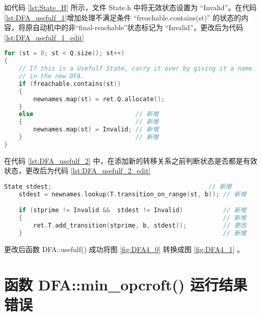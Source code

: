 如代码 \ref{lst:State_H} 所示，文件 State.h 中将无效状态设置为 “Invalid”。在代码 \ref{lst:DFA_usefulf_1}增加处理不满足条件 “freachable.contains(st)” 的状态的内容，将原自动机中的非“final-reachable”状态标记为 “Invalid”，更改后为代码 \ref{lst:DFA_usefulf_1_edit}
\lstset{style=mystyle}
\begin{lstlisting}[language=C++,label={lst:DFA_usefulf_1_edit},caption={ 更改后的 DFA.cpp },firstnumber=91]
for (st = 0; st < Q.size(); st++)
{
    // If this is a Usefulf State, carry it over by giving it a name
    // in the new DFA.
    if (freachable.contains(st))
    {
        newnames.map(st) = ret.Q.allocate();
    }
    else                            // 新增
    {                               // 新增
        newnames.map(st) = Invalid; // 新增
    }                               // 新增
}
\end{lstlisting}

在代码 \ref{lst:DFA_usefulf_2} 中，在添加新的转移关系之前判断状态是否都是有效状态，更改后为代码 \ref{lst:DFA_usefulf_2_edit}
\lstset{style=mystyle}
\begin{lstlisting}[language=C++,label={lst:DFA_usefulf_2_edit},caption={ 更改后的 DFA.cpp },firstnumber=133]
    State stdest;                                           // 新增
    stdest = newnames.lookup(T.transition_on_range(st, b)); // 新增

    if (stprime != Invalid &&  stdest != Invalid)           // 新增
    {                                                       // 新增
        ret.T.add_transition(stprime, b, stdest));          // 更改
    }                                                       // 新增
\end{lstlisting}

更改后函数 DFA::usefulf() 成功将图 \ref{fig:DFA4_0} 转换成图 \ref{fig:DFA4_1} 。

\section{函数 DFA::min\_opcroft() 运行结果错误}